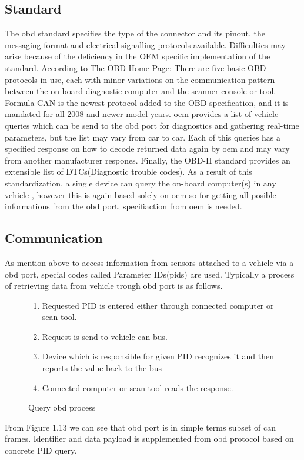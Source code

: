 \subsection{Standard}
The \gls{obd} standard specifies the type of the connector and its pinout, the messaging format and electrical signalling protocols available. Difficulties may arise because of the deficiency in the OEM specific implementation of the standard. According to The OBD Home Page: There are five basic OBD protocols in use, each with minor variations on the communication pattern between the on-board diagnostic computer and the scanner console or tool. Formula CAN is the newest protocol added to the OBD specification, and it is mandated for all 2008 and newer model years\cite{7223296}. \gls{oem} provides a list of vehicle queries which can be send to the \gls{obd} port for diagnostics and gathering real-time parameters, but the list may vary from car to car. Each of this queries has a specified response on how to decode returned data again by \gls{oem} and may vary from another manufacturer respones. Finally, the OBD-II standard provides an extensible list of DTCs(Diagnostic trouble codes). As a result of this standardization, a single device can query the on-board computer(s) in any vehicle \cite{obdiso}, however this is again based solely on \gls{oem} so for getting all posible informations from the \gls{obd} port, specifiaction from \gls{oem} is needed.
\subsection{Communication}
As mention above to access information from sensors attached to a vehicle via a \gls{obd} port, special codes called Parameter IDs(\gls{pids}) are used. Typically a process of retrieving data from vehicle trough \gls{obd} port is as follows.
\begin{figure}[H]
\begin{center}
\begin{enumerate}
	\item Requested PID is entered either through connected computer or scan tool.
	\item Request is send to vehicle \gls{can} bus.
	\item Device which is responsible for given PID recognizes it and then reports the value back to the bus
	\item Connected computer or scan tool reads the response.
\end{enumerate}
\captionsetup{font=small}
\label{fig:bul1}
\caption{Query \gls{obd} process}
\end{center}
\end{figure}
From Figure 1.13 we can see that  \gls{obd} port is in simple terms subset of \gls{can} frames. Identifier and data payload is supplemented from \gls{obd} protocol based on concrete PID query.
